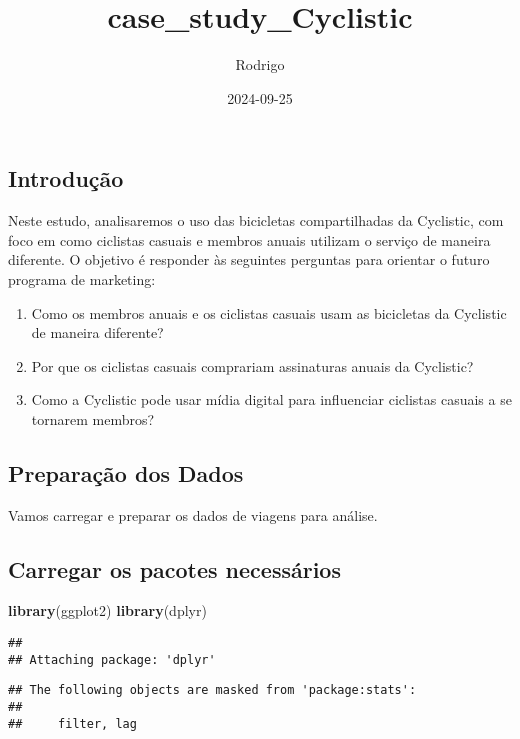 \documentclass[
]{article}
\title{case\_study\_Cyclistic}
\author{Rodrigo}
\date{2024-09-25}
\newenvironment{Shaded}{\begin{snugshade}}{\end{snugshade}}
\newcommand{\FunctionTok}[1]{\textcolor[rgb]{0.13,0.29,0.53}{\textbf{#1}}}
\newcommand{\NormalTok}[1]{#1}
\providecommand{\tightlist}{%
  \setlength{\itemsep}{0pt}\setlength{\parskip}{0pt}}
\begin{document}
\maketitle

\subsection{Introdução}\label{introduuxe7uxe3o}

Neste estudo, analisaremos o uso das bicicletas compartilhadas da
Cyclistic, com foco em como ciclistas casuais e membros anuais utilizam
o serviço de maneira diferente. O objetivo é responder às seguintes
perguntas para orientar o futuro programa de marketing:

\begin{enumerate}
\def\labelenumi{\arabic{enumi}.}
\tightlist
\item
  Como os membros anuais e os ciclistas casuais usam as bicicletas da
  Cyclistic de maneira diferente?
\item
  Por que os ciclistas casuais comprariam assinaturas anuais da
  Cyclistic?
\item
  Como a Cyclistic pode usar mídia digital para influenciar ciclistas
  casuais a se tornarem membros?
\end{enumerate}

\subsection{Preparação dos Dados}\label{preparauxe7uxe3o-dos-dados}

Vamos carregar e preparar os dados de viagens para análise.

\subsection{Carregar os pacotes
necessários}\label{carregar-os-pacotes-necessuxe1rios}

\begin{Shaded}
\begin{Highlighting}[]
\FunctionTok{library}\NormalTok{(ggplot2) }
\FunctionTok{library}\NormalTok{(dplyr)}
\end{Highlighting}
\end{Shaded}

\begin{verbatim}
## 
## Attaching package: 'dplyr'
\end{verbatim}

\begin{verbatim}
## The following objects are masked from 'package:stats':
## 
##     filter, lag
\end{verbatim}
\end{document}
